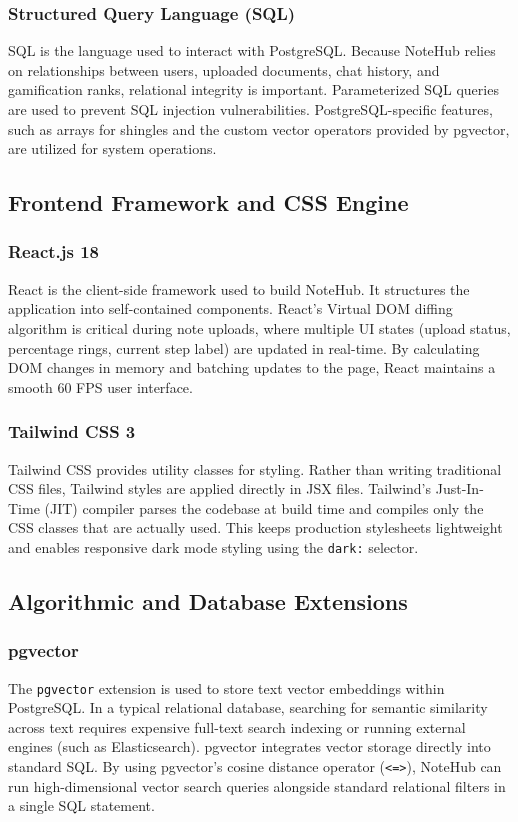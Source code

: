 \documentclass[12,Times new Roman,a4paper]{report}
\begin{document}
\subsubsection*{Structured Query Language (SQL)}
SQL is the language used to interact with PostgreSQL. Because NoteHub relies on relationships between users, uploaded documents, chat history, and gamification ranks, relational integrity is important. Parameterized SQL queries are used to prevent SQL injection vulnerabilities. PostgreSQL-specific features, such as arrays for shingles and the custom vector operators provided by pgvector, are utilized for system operations.

\subsection{Frontend Framework and CSS Engine}

\subsubsection*{React.js 18}
React is the client-side framework used to build NoteHub. It structures the application into self-contained components. React's Virtual DOM diffing algorithm is critical during note uploads, where multiple UI states (upload status, percentage rings, current step label) are updated in real-time. By calculating DOM changes in memory and batching updates to the page, React maintains a smooth 60 FPS user interface.

\subsubsection*{Tailwind CSS 3}
Tailwind CSS provides utility classes for styling. Rather than writing traditional CSS files, Tailwind styles are applied directly in JSX files. Tailwind's Just-In-Time (JIT) compiler parses the codebase at build time and compiles only the CSS classes that are actually used. This keeps production stylesheets lightweight and enables responsive dark mode styling using the \texttt{dark:} selector.

\subsection{Algorithmic and Database Extensions}

\subsubsection*{pgvector}
The \texttt{pgvector} extension is used to store text vector embeddings within PostgreSQL. In a typical relational database, searching for semantic similarity across text requires expensive full-text search indexing or running external engines (such as Elasticsearch). pgvector integrates vector storage directly into standard SQL. By using pgvector's cosine distance operator (\texttt{<=>}), NoteHub can run high-dimensional vector search queries alongside standard relational filters in a single SQL statement.
\end{document}
